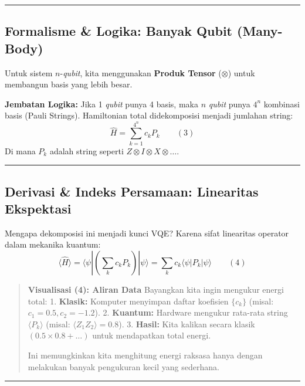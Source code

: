 \begin{center}\rule{0.5\linewidth}{0.5pt}\end{center}

\hypertarget{jembatan-formalisme-logika-banyak-qubit-many-body}{%
\subsection{Formalisme \& Logika: Banyak Qubit (Many-Body)}\label{jembatan-formalisme-logika-banyak-qubit-many-body}}

Untuk sistem \(n\)-\emph{qubit}, kita menggunakan \textbf{Produk Tensor} (\(\otimes\)) untuk membangun basis yang lebih besar.

\textbf{Jembatan Logika:} Jika 1 \emph{qubit} punya 4 basis, maka \(n\) \emph{qubit} punya \(4^n\) kombinasi basis (Pauli Strings). Hamiltonian total didekomposisi menjadi jumlahan string: \[ \hat{H} = \sum_{k=1}^{4^n} c_k P_k \qquad (3) \] Di mana \(P_k\) adalah string seperti \(Z \otimes I \otimes X \otimes \dots\).

\begin{center}\rule{0.5\linewidth}{0.5pt}\end{center}

\hypertarget{derivasi-scratchpad-indeks-persamaan-linearitas-ekspektasi}{%
\subsection{Derivasi \& Indeks Persamaan: Linearitas Ekspektasi}\label{derivasi-scratchpad-indeks-persamaan-linearitas-ekspektasi}}

Mengapa dekomposisi ini menjadi kunci VQE? Karena sifat linearitas operator dalam mekanika kuantum: \[ \langle \hat{H} \rangle = \langle \psi | \left( \sum_k c_k P_k \right) | \psi \rangle = \sum_k c_k \langle \psi | P_k | \psi \rangle \qquad (4) \]

\begin{quote}
\textbf{Visualisasi (4): Aliran Data} Bayangkan kita ingin mengukur energi total: 1. \textbf{Klasik:} Komputer menyimpan daftar koefisien \(\{c_k\}\) (misal: \(c_1=0.5, c_2=-1.2\)). 2. \textbf{Kuantum:} Hardware mengukur rata-rata string \(\langle P_k \rangle\) (misal: \(\langle Z_1 Z_2 \rangle = 0.8\)). 3. \textbf{Hasil:} Kita kalikan secara klasik \((0.5 \times 0.8 + \dots)\) untuk mendapatkan total energi.

Ini memungkinkan kita menghitung energi raksasa hanya dengan melakukan banyak pengukuran kecil yang sederhana.
\end{quote}

\begin{center}\rule{0.5\linewidth}{0.5pt}\end{center}
